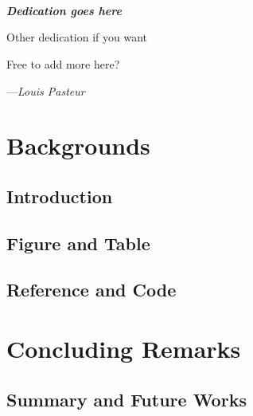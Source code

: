 \documentclass[12pt]{report}
\begin{document}
\clearpage

~ \\ ~ \\ ~ \\
\begin{center}
\textbf{\textit{
Dedication goes here
}}
\end{center}

\mbox{}
\vfill
{Other dedication if you want}

{\footnotesize
Free to add more here?
}

\hfill ---\textit{Louis Pasteur}
\clearpage


\part{Backgrounds}\label{part-bkg}

\chapter{Introduction}\label{c:intro}



\chapter{Figure and Table}


\chapter{Reference and Code}



\part{Concluding Remarks}\label{part-conclusion}
\chapter{Summary and Future Works}\label{c:summary}





\clearpage
{}


\end{document}
